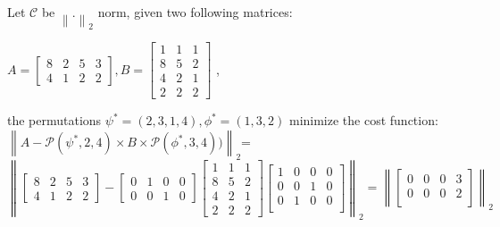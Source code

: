 \documentclass[conference]{IEEEtran}
\begin{document}
{\begin{example}
Let $\mathcal{C}$ be $\left\|.\right\|_2$ norm, given two following matrices:
\begin{center}
{\small{
$A = \begin{bmatrix} 
8 & 2 & 5 & 3\\
4 & 1 & 2 & 2
\end{bmatrix}, B = \begin{bmatrix}
1 & 1 & 1\\
8 & 5 & 2\\
4 & 2 & 1\\
2 & 2 & 2 
\end{bmatrix}$
}}, \\ 
\end{center}
the permutations
$\psi^* = (2,3,1,4), \phi^*=(1,3,2)$ minimize the cost function:
$\left\|A - \mathcal{P}(\psi^*,2,4)\times B \times\mathcal{P}(\phi^*,3,4))\right\|_2$=\\
{\scriptsize{
$
\left\|\begin{bmatrix} 
8 & 2 & 5 & 3 \\
4 & 1 & 2 & 2 
\end{bmatrix} - 
\begin{bmatrix} 
0 & 1 & 0 & 0 \\
0 & 0 & 1 & 0 
\end{bmatrix}
\begin{bmatrix} 
1 & 1 & 1 \\
8 & 5 & 2 \\
4 & 2 & 1 \\
2 & 2 & 2 
\end{bmatrix}
\begin{bmatrix} 
1 & 0 & 0 & 0 \\
0 & 0 & 1 & 0 \\
0 & 1 & 0 & 0 \\
\end{bmatrix}\right\|_2
=
\left\|\begin{bmatrix} 
0 & 0 & 0 & 3 \\
0 & 0 & 0 & 2 \\
\end{bmatrix}\right\|_2$
}}
\label{exp:alignment_problem}
\end{example}




}
\end{document}
